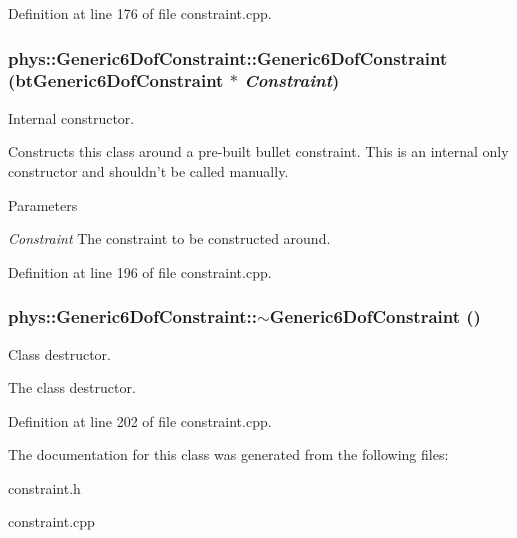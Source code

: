 Definition at line 176 of file constraint.cpp.

\hypertarget{classphys_1_1Generic6DofConstraint_a7e44417fc8f56eb1770990fa3c3273d3}{
\subsubsection[{Generic6DofConstraint}]{\setlength{\rightskip}{0pt plus 5cm}phys::Generic6DofConstraint::Generic6DofConstraint (btGeneric6DofConstraint $\ast$ {\em Constraint})}}
\label{de/d2a/classphys_1_1Generic6DofConstraint_a7e44417fc8f56eb1770990fa3c3273d3}


Internal constructor. 

Constructs this class around a pre-\/built bullet constraint. This is an internal only constructor and shouldn't be called manually. 
\begin{DoxyParams}{Parameters}
\item[{\em Constraint}]The constraint to be constructed around. \end{DoxyParams}


Definition at line 196 of file constraint.cpp.

\hypertarget{classphys_1_1Generic6DofConstraint_a0b0bd2e1f1546ed1e6b2ebc2a505a126}{
\subsubsection[{$\sim$Generic6DofConstraint}]{\setlength{\rightskip}{0pt plus 5cm}phys::Generic6DofConstraint::$\sim$Generic6DofConstraint ()}}
\label{de/d2a/classphys_1_1Generic6DofConstraint_a0b0bd2e1f1546ed1e6b2ebc2a505a126}


Class destructor. 

The class destructor. 

Definition at line 202 of file constraint.cpp.



The documentation for this class was generated from the following files:\begin{DoxyCompactItemize}
\item 
constraint.h\item 
constraint.cpp\end{DoxyCompactItemize}
